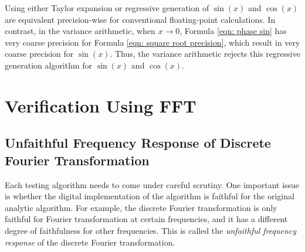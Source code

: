 \documentclass[twoside]{article}
\numberwithin{equation}{section}
\newcommand{\eqspace}{\;\;\;}
\begin{document}
Using either Taylor expansion or regressive generation of $\sin(x)$ and $\cos(x)$ are equivalent precision-wise for conventional floating-point calculations.
In contrast, in the variance arithmetic, when $x \rightarrow 0$, Formula \eqref{eqn: phase sin} has very coarse precision for Formula \ref{eqn: square root precision}, which result in very coarse precision for $\sin(x)$. 
Thus, the variance arithmetic rejects this regressive generation algorithm for $\sin(x)$ and $\cos(x)$.




\clearpage
\section{Verification Using FFT}
\label{sec: FFT}


\subsection{Unfaithful Frequency Response of Discrete Fourier Transformation \cite{Prev_Precision_Arithmetic}}

Each testing algorithm needs to come under careful scrutiny.  
One important issue is whether the digital implementation of the algorithm is faithful for the original analytic algorithm.  
For example, the discrete Fourier transformation is only faithful for Fourier transformation at certain frequencies, and it has a different degree of faithfulness for other frequencies.  
This is called the \emph{unfaithful frequency response} of the discrete Fourier transformation.
\end{document}

